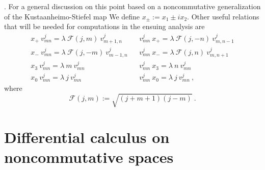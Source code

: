 \documentclass[10pt]{book}
\theoremstyle{break}
\begin{document}
. For a general discussion on this point based on a noncommutative generalization of the Kustaanheimo-Stiefel map %
%
We define $x_\pm := x_1\pm i x_2$. Other useful relations %
that will be needed for computations in the ensuing analysis are%
%
\begin{eqnarray}
x_+ \ v^j_{mn} = \lambda \ \mathcal{F}(j,m) \ v^j_{m+1, n}  
&& v^j_{mn} \ x_+ = \lambda \ \mathcal{F}(j,-n) \ v^j_{m, n -1} \nonumber \\
x_- \ v^j_{mn} = \lambda \ \mathcal{F}(j,-m) \ v^j_{m-1,n}  
&& v^j_{mn} \ x_- = \lambda \ \mathcal{F}(j,n) \ v^j_{m,n +1} \nonumber \\
x_3 \ v^j_{mn} = \lambda \ m \ v^j_{mn}
&& v^j_{mn} \ x_3 = \lambda \ n \ v^j_{mn} \nonumber \\
x_0 \ v^j_{mn} = \lambda \ j \ v^j_{mn}
&& v^j_{mn} \ x_0 = \lambda \ j \ v^j_{mn} \ , %
\end{eqnarray}
%
where%
%
\begin{equation}
\mathcal{F}(j,m):=\sqrt{(j+m+1)(j-m)} \ . %
\end{equation}


\section{Differential calculus on noncommutative spaces}
\end{document}
